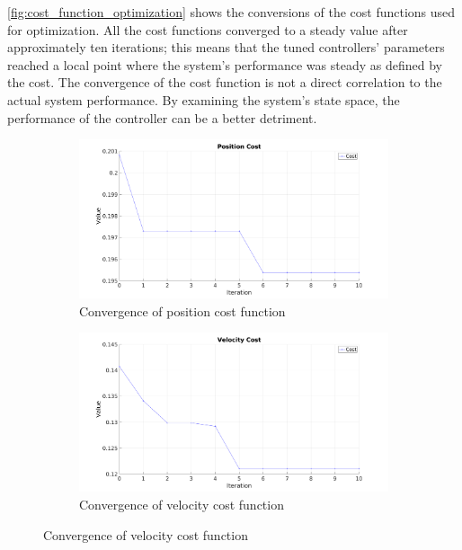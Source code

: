 \autoref{fig:cost_function_optimization} shows the conversions of the cost functions used for optimization. All the cost functions converged to a steady value after approximately ten iterations; this means that the tuned controllers' parameters reached a local point where the system's performance was steady as defined by the cost. The convergence of the cost function is not a direct correlation to the actual system performance. By examining the system's state space, the performance of the controller can be a better detriment.





\begin{figure}[ht]
    \begin{subfigure}{0.5\textwidth}
        \centering
        \includegraphics[width=0.9\linewidth]{images/controllers/pos_cost.png}
        \caption[Position cost function]{Convergence of position cost function}
        \label{fig:pos_cost}
    \end{subfigure}
    \begin{subfigure}{0.5\textwidth}
        \centering
        \includegraphics[width=0.9\linewidth]{images/controllers/vel_cost.png}
        \caption[Velocity cost function]{Convergence of velocity cost function}
        \label{fig:vel_cost}
    \end{subfigure}


\end{figure}
